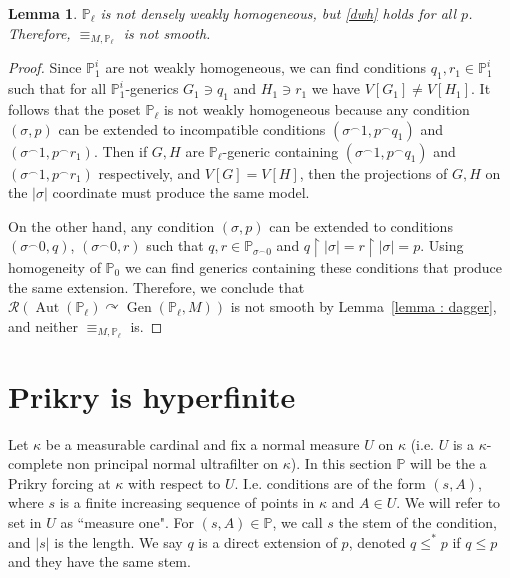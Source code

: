 \documentclass{amsart}
\newcommand{\Gen}{\operatorname{Gen}}
\newcommand{\cat}{^\frown}
\DeclareMathOperator{\Aut}{Aut}
\newtheorem{lemma}[theorem]{Lemma}
\theoremstyle{definition}
\theoremstyle{remark}
\begin{document}
\begin{lemma}
\(\mathbb{P}_\ell\) is not densely weakly homogeneous,  but \eqref{dwh} holds for all $p$.
Therefore, \(\equiv_{M,\mathbb{P}_\ell}\) is not smooth.
\end{lemma}
\begin{proof}
Since \(\mathbb{P}^i_1\) are not weakly homogeneous, we can find conditions \(q_1,r_1\in \mathbb{P}^i_1\) such that for all \(\mathbb{P}^i_1\)-generics \(G_1\ni q_1\) and \(H_1\ni r_1\) we have \(V[G_1]\neq V[H_1]\).
It follows that the poset $\mathbb{P}_\ell$ is not weakly homogeneous because any condition $(\sigma,p)$ can be extended to incompatible conditions $({\sigma\cat 1}, p\cat q_1)$ and \(({\sigma\cat 1}, p\cat r_1)
\). Then if \(G,H\) are \(\mathbb{P}_\ell\)-generic containing $({\sigma\cat 1}, p\cat q_1)$ and \(({\sigma\cat 1}, p\cat r_1)\) respectively, and \(V[G]=V[H]\), then  the projections of \(G,H\) on the \(|\sigma|\) coordinate must produce the same model.

On the other hand,  any condition $(\sigma,p)$ can be extended to conditions  $({\sigma\cat 0}, q)$, $({\sigma\cat 0},r)$ such that \(q,r\in\mathbb{P}_{\sigma\cat 0}\) and  $q\upharpoonright |\sigma|=r\upharpoonright |\sigma|=p$.  Using homogeneity of $\mathbb{P}_0$ we can find generics containing these conditions that produce the same extension.  Therefore,  we conclude that \(\mathcal{R}(\Aut(\mathbb{P}_\ell)\curvearrowright \Gen(\mathbb{P}_\ell, M))\) is not smooth by Lemma~\ref{lemma : dagger},  and neither \(\equiv_{M,\mathbb{P}_\ell}\) is.
\end{proof}






\section{Prikry is hyperfinite}
\label{sec : Prikry}

Let $\kappa$ be a measurable cardinal and fix a normal measure $U$ on $\kappa$ (i.e. $U$ is a $\kappa$-complete non principal normal ultrafilter on $\kappa$). In this section $\mathbb{P}$ will be the a Prikry forcing at $\kappa$ with respect to $U$. I.e. conditions are of the form $(s, A)$, where $s$ is a finite increasing sequence of points in $\kappa$ and $A\in U$. We will refer to set in $U$ as ``measure one". For $(s, A)\in\mathbb{P}$, we call $s$ the stem of the condition, and $|s|$ is the length. We say $q$ is a direct extension of $p$, denoted $q\leq^* p$ if $q\leq p$ and they have the same stem.
\end{document}
